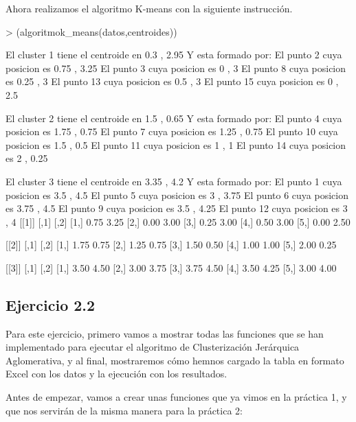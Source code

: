 \documentclass[parskip=full]{scrartcl}
\begin{document}
Ahora realizamos el algoritmo K-means con la siguiente instrucción.


\begin{Schunk}
\begin{Sinput}
> (algoritmok_means(datos,centroides))
\end{Sinput}
\begin{Soutput}
El cluster 1 tiene el centroide en 0.3 , 2.95 
Y esta formado por:
El punto 2 cuya posicion es 0.75 , 3.25 
El punto 3 cuya posicion es 0 , 3 
El punto 8 cuya posicion es 0.25 , 3 
El punto 13 cuya posicion es 0.5 , 3 
El punto 15 cuya posicion es 0 , 2.5 


El cluster 2 tiene el centroide en 1.5 , 0.65 
Y esta formado por:
El punto 4 cuya posicion es 1.75 , 0.75 
El punto 7 cuya posicion es 1.25 , 0.75 
El punto 10 cuya posicion es 1.5 , 0.5 
El punto 11 cuya posicion es 1 , 1 
El punto 14 cuya posicion es 2 , 0.25 


El cluster 3 tiene el centroide en 3.35 , 4.2 
Y esta formado por:
El punto 1 cuya posicion es 3.5 , 4.5 
El punto 5 cuya posicion es 3 , 3.75 
El punto 6 cuya posicion es 3.75 , 4.5 
El punto 9 cuya posicion es 3.5 , 4.25 
El punto 12 cuya posicion es 3 , 4 
[[1]]
     [,1] [,2]
[1,] 0.75 3.25
[2,] 0.00 3.00
[3,] 0.25 3.00
[4,] 0.50 3.00
[5,] 0.00 2.50

[[2]]
     [,1] [,2]
[1,] 1.75 0.75
[2,] 1.25 0.75
[3,] 1.50 0.50
[4,] 1.00 1.00
[5,] 2.00 0.25

[[3]]
     [,1] [,2]
[1,] 3.50 4.50
[2,] 3.00 3.75
[3,] 3.75 4.50
[4,] 3.50 4.25
[5,] 3.00 4.00
\end{Soutput}
\end{Schunk}


\subsection{Ejercicio 2.2}

Para este ejercicio, primero vamos a mostrar todas las funciones que se han implementado para ejecutar el algoritmo de Clusterización Jerárquica Aglomerativa, y al final, mostraremos cómo hemnos cargado la tabla en formato Excel con los datos y la ejecución con los resultados.

Antes de empezar, vamos a crear unas funciones que ya vimos en la práctica 1, y que nos servirán de la misma manera para la práctica 2:
\end{document}
